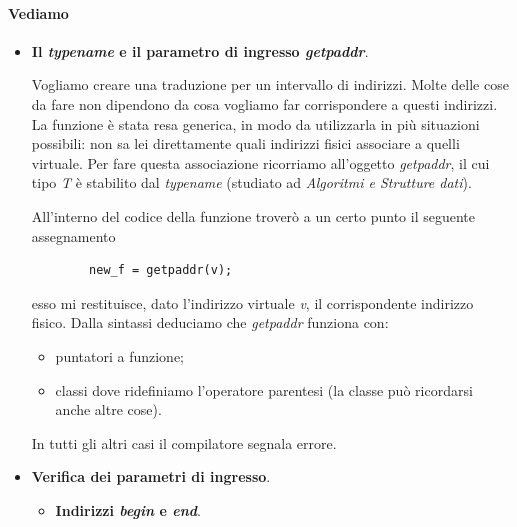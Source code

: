 \paragraph{Vediamo}
\begin{itemize}
	\item \textbf{Il \emph{typename} e il parametro di ingresso \emph{getpaddr}}.
	
	Vogliamo creare una traduzione per un intervallo di indirizzi. Molte delle cose da fare non dipendono da cosa vogliamo far corrispondere a questi indirizzi. La funzione è stata resa generica, in modo da utilizzarla in più situazioni possibili: non sa lei direttamente quali indirizzi fisici associare a quelli virtuale. Per fare questa associazione ricorriamo all'oggetto \emph{getpaddr}, il cui tipo \emph{T} è stabilito dal \emph{typename} (studiato ad \emph{Algoritmi e Strutture dati}).
	
	All'interno del codice della funzione troverò a un certo punto il seguente assegnamento
	\begin{verbatim}
		new_f = getpaddr(v);
	\end{verbatim}
	esso mi restituisce, dato l'indirizzo virtuale \emph{v}, il corrispondente indirizzo fisico. Dalla sintassi deduciamo che \emph{getpaddr} funziona con:
	\begin{itemize}
		\item puntatori a funzione;
		\item classi dove ridefiniamo l'operatore parentesi (la classe può ricordarsi anche altre cose).
	\end{itemize}
	In tutti gli altri casi il compilatore segnala errore.
	\item \textbf{Verifica dei parametri di ingresso}.
	\begin{itemize}
		\item \textbf{Indirizzi \emph{begin} e \emph{end}}. 
		

\end{itemize}
\end{itemize}
